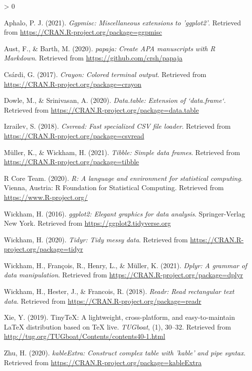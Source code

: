 \documentclass[
  english,
  man]{apa6}
\newlength{\cslhangindent}
\newenvironment{CSLReferences}[2] %
 {%
  \setlength{\parindent}{0pt}
  \ifodd #1 \everypar{\setlength{\hangindent}{\cslhangindent}}\ignorespaces\fi
  \ifnum #2 > 0
  \setlength{\parskip}{#2\baselineskip}
  \fi
 }%
 {}
\begin{document}
\hypertarget{refs}{}
\begin{CSLReferences}{1}{0}
\leavevmode\hypertarget{ref-R-ggpmisc}{}%
Aphalo, P. J. (2021). \emph{Ggpmisc: Miscellaneous extensions to 'ggplot2'}. Retrieved from \url{https://CRAN.R-project.org/package=ggpmisc}

\leavevmode\hypertarget{ref-R-papaja}{}%
Aust, F., \& Barth, M. (2020). \emph{{papaja}: {Create} {APA} manuscripts with {R Markdown}}. Retrieved from \url{https://github.com/crsh/papaja}

\leavevmode\hypertarget{ref-R-crayon}{}%
Csárdi, G. (2017). \emph{Crayon: Colored terminal output}. Retrieved from \url{https://CRAN.R-project.org/package=crayon}

\leavevmode\hypertarget{ref-R-data.table}{}%
Dowle, M., \& Srinivasan, A. (2020). \emph{Data.table: Extension of `data.frame`}. Retrieved from \url{https://CRAN.R-project.org/package=data.table}

\leavevmode\hypertarget{ref-R-csvread}{}%
Izrailev, S. (2018). \emph{Csvread: Fast specialized CSV file loader}. Retrieved from \url{https://CRAN.R-project.org/package=csvread}

\leavevmode\hypertarget{ref-R-tibble}{}%
Müller, K., \& Wickham, H. (2021). \emph{Tibble: Simple data frames}. Retrieved from \url{https://CRAN.R-project.org/package=tibble}

\leavevmode\hypertarget{ref-R-base}{}%
R Core Team. (2020). \emph{R: A language and environment for statistical computing}. Vienna, Austria: R Foundation for Statistical Computing. Retrieved from \url{https://www.R-project.org/}

\leavevmode\hypertarget{ref-R-ggplot2}{}%
Wickham, H. (2016). \emph{ggplot2: Elegant graphics for data analysis}. Springer-Verlag New York. Retrieved from \url{https://ggplot2.tidyverse.org}

\leavevmode\hypertarget{ref-R-tidyr}{}%
Wickham, H. (2020). \emph{Tidyr: Tidy messy data}. Retrieved from \url{https://CRAN.R-project.org/package=tidyr}

\leavevmode\hypertarget{ref-R-dplyr}{}%
Wickham, H., François, R., Henry, L., \& Müller, K. (2021). \emph{Dplyr: A grammar of data manipulation}. Retrieved from \url{https://CRAN.R-project.org/package=dplyr}

\leavevmode\hypertarget{ref-R-readr}{}%
Wickham, H., Hester, J., \& Francois, R. (2018). \emph{Readr: Read rectangular text data}. Retrieved from \url{https://CRAN.R-project.org/package=readr}

\leavevmode\hypertarget{ref-R-tinytex}{}%
Xie, Y. (2019). TinyTeX: A lightweight, cross-platform, and easy-to-maintain LaTeX distribution based on TeX live. \emph{TUGboat}, (1), 30--32. Retrieved from \url{http://tug.org/TUGboat/Contents/contents40-1.html}

\leavevmode\hypertarget{ref-R-kableExtra}{}%
Zhu, H. (2020). \emph{kableExtra: Construct complex table with 'kable' and pipe syntax}. Retrieved from \url{https://CRAN.R-project.org/package=kableExtra}

\end{CSLReferences}

\endgroup
\end{document}
